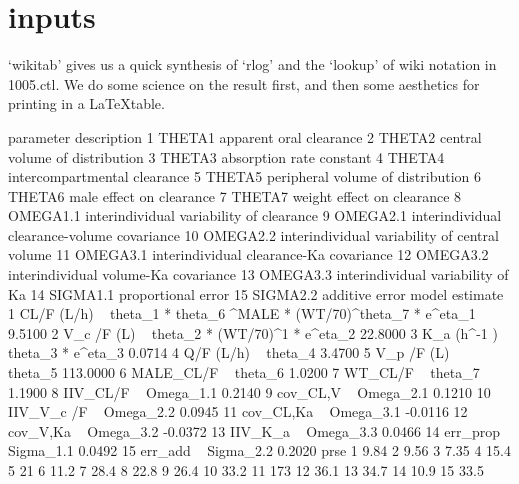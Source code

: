 \section{inputs}
`wikitab' gives us a quick synthesis of `rlog' and the `lookup' of wiki notation in 1005.ctl.
We do some science on the result first, and then some aesthetics for printing in a \LaTeX table.
\begin{Schunk}
\begin{Soutput}
   parameter                                   description
1     THETA1                       apparent oral clearance
2     THETA2                central volume of distribution
3     THETA3                      absorption rate constant
4     THETA4                  intercompartmental clearance
5     THETA5             peripheral volume of distribution
6     THETA6                      male effect on clearance
7     THETA7                    weight effect on clearance
8   OMEGA1.1      interindividual variability of clearance
9   OMEGA2.1   interindividual clearance-volume covariance
10  OMEGA2.2 interindividual variability of central volume
11  OMEGA3.1       interindividual clearance-Ka covariance
12  OMEGA3.2          interindividual volume-Ka covariance
13  OMEGA3.3             interindividual variability of Ka
14  SIGMA1.1                            proportional error
15  SIGMA2.2                                additive error
                                                                model estimate
1  CL/F (L/h) ~ theta_1 *  theta_6 ^MALE * (WT/70)^theta_7  * e^eta_1   9.5100
2                          V_c /F (L) ~ theta_2 * (WT/70)^1 * e^eta_2  22.8000
3                                     K_a (h^-1 ) ~ theta_3 * e^eta_3   0.0714
4                                                 Q/F (L/h) ~ theta_4   3.4700
5                                                V_p /F (L) ~ theta_5 113.0000
6                                                 MALE_CL/F ~ theta_6   1.0200
7                                                   WT_CL/F ~ theta_7   1.1900
8                                                IIV_CL/F ~ Omega_1.1   0.2140
9                                                cov_CL,V ~ Omega_2.1   0.1210
10                                             IIV_V_c /F ~ Omega_2.2   0.0945
11                                             cov_CL,Ka  ~ Omega_3.1  -0.0116
12                                              cov_V,Ka  ~ Omega_3.2  -0.0372
13                                               IIV_K_a  ~ Omega_3.3   0.0466
14                                               err_prop ~ Sigma_1.1   0.0492
15                                                err_add ~ Sigma_2.2   0.2020
   prse
1  9.84
2  9.56
3  7.35
4  15.4
5    21
6  11.2
7  28.4
8  22.8
9  26.4
10 33.2
11  173
12 36.1
13 34.7
14 10.9
15 33.5
\end{Soutput}
\end{Schunk}
